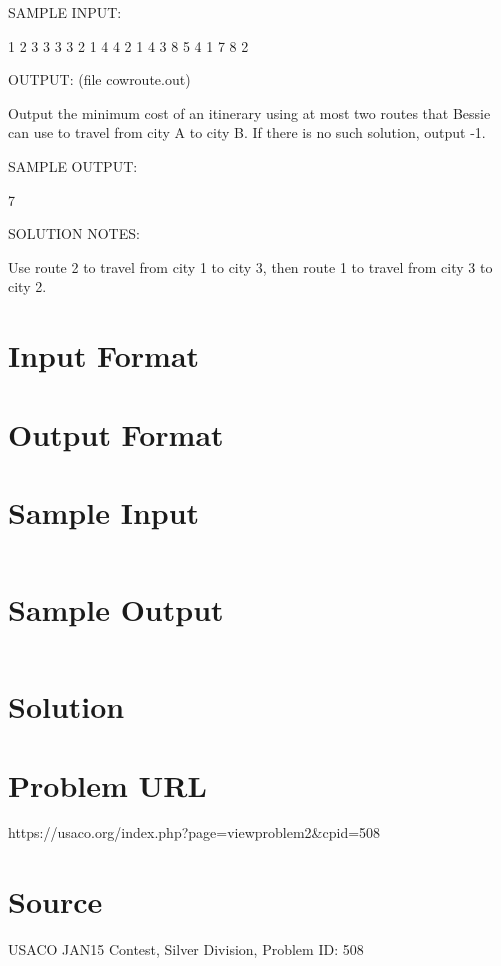\documentclass[12pt]{article}
\begin{document}
SAMPLE INPUT:

1 2 3
3 3
3 2 1
4 4
2 1 4 3
8 5
4 1 7 8 2

OUTPUT: (file cowroute.out)

Output the minimum cost of an itinerary using at most two routes that
Bessie can use to travel from city A to city B.  If there is no such
solution, output -1.

SAMPLE OUTPUT:

7

SOLUTION NOTES:

Use route 2 to travel from city 1 to city 3, then route 1 to travel
from city 3 to city 2.




\section*{Input Format}


\section*{Output Format}


\section*{Sample Input}
\begin{verbatim}

\end{verbatim}

\section*{Sample Output}
\begin{verbatim}

\end{verbatim}

\section*{Solution}


\section*{Problem URL}
https://usaco.org/index.php?page=viewproblem2&cpid=508

\section*{Source}
USACO JAN15 Contest, Silver Division, Problem ID: 508
\end{document}
